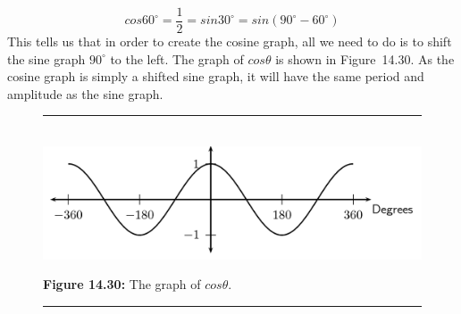     \begin{equation}
    cos{60}^{\circ }=\frac{1}{2}=sin{30}^{\circ }=sin\left({90}^{\circ }-{60}^{\circ }\right)\tag{14.33}
      \end{equation}
        \label{m39414*id87280}This tells us that in order to create the cosine graph, all we need to do is to shift the sine graph ${90}^{\circ }$ to the left. The graph of $cos\theta $ is shown in Figure~14.30. As the cosine graph is simply a shifted sine graph, it will have the same period and amplitude as the sine graph.\par 
    \setcounter{subfigure}{0}
	\begin{figure}[H] %
    \begin{center}
    \rule[.1in]{\figurerulewidth}{.005in} \\
        \label{m39414*uid50!!!underscore!!!media}\label{m39414*uid50!!!underscore!!!printimage}\includegraphics{col11306.imgs/m39414_MG10C15_024.png} %
      \vspace{2pt}
    \vspace{\rubberspace}\par \begin{cnxcaption}
	  \small \textbf{Figure 14.30: }The graph of $cos\theta $.
	\end{cnxcaption}
    \vspace{.1in}
    \rule[.1in]{\figurerulewidth}{.005in} \\
    \end{center}
 \end{figure}       
      \label{m39414*uid51}
